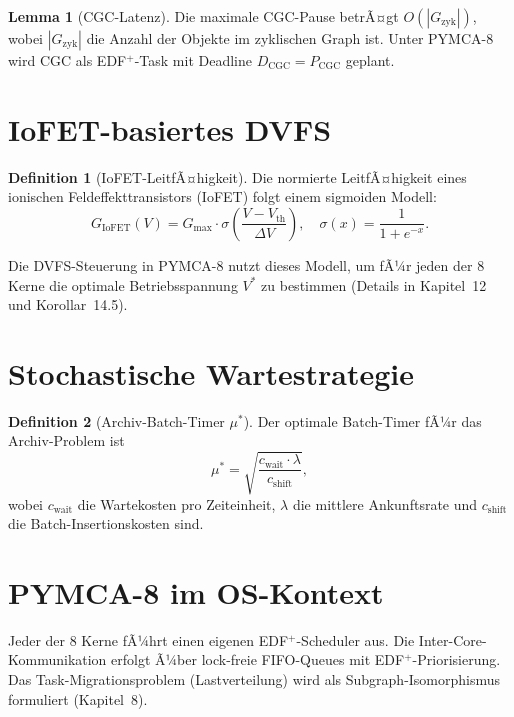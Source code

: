 ﻿\documentclass[a4paper,12pt]{scrreprt}
\theoremstyle{definition}
\newtheorem{definition}{Definition}[chapter]
\newtheorem{lemma}{Lemma}[chapter]
\begin{document}
	\begin{lemma}[CGC-Latenz]\label{lem:cgc}
		Die maximale CGC-Pause betrÃ¤gt $O(|G_{\mathrm{zyk}}|)$, wobei
		$|G_{\mathrm{zyk}}|$ die Anzahl der Objekte im zyklischen Graph ist.
		Unter PYMCA-8 wird CGC als EDF$^+$-Task mit Deadline
		$D_{\mathrm{CGC}} = P_{\mathrm{CGC}}$ geplant.
	\end{lemma}
	
	\section{IoFET-basiertes DVFS}
	
	\begin{definition}[IoFET-LeitfÃ¤higkeit]
		Die normierte LeitfÃ¤higkeit eines ionischen Feldeffekttransistors
		(IoFET) \cite{Epp2026iono} folgt einem sigmoiden Modell:
		\[
		G_{\mathrm{IoFET}}(V) = G_{\max} \cdot \sigma\!\left(\frac{V - V_{\mathrm{th}}}{\Delta V}\right),
		\quad
		\sigma(x) = \frac{1}{1 + e^{-x}}.
		\]
	\end{definition}
	
	Die DVFS-Steuerung in PYMCA-8 nutzt dieses Modell, um fÃ¼r jeden der
	8 Kerne die optimale Betriebsspannung $V^*$ zu bestimmen (Details in
	Kapitel~12 und Korollar~14.5).
	
	\section{Stochastische Wartestrategie}
	
	\begin{definition}[Archiv-Batch-Timer $\mu^*$]
		Der optimale Batch-Timer fÃ¼r das Archiv-Problem \cite{Epp2026archv} ist
		\[
		\mu^* = \sqrt{\frac{c_{\mathrm{wait}} \cdot \lambda}{c_{\mathrm{shift}}}},
		\]
		wobei $c_{\mathrm{wait}}$ die Wartekosten pro Zeiteinheit,
		$\lambda$ die mittlere Ankunftsrate und $c_{\mathrm{shift}}$
		die Batch-Insertionskosten sind.
	\end{definition}
	
	\section{PYMCA-8 im OS-Kontext}
	
	Jeder der 8 Kerne fÃ¼hrt einen eigenen EDF$^+$-Scheduler aus. Die
	Inter-Core-Kommunikation erfolgt Ã¼ber lock-freie FIFO-Queues mit
	EDF$^+$-Priorisierung. Das Task-Migrationsproblem (Lastverteilung)
	wird als Subgraph-Isomorphismus formuliert (Kapitel~8).
	
\end{document}
